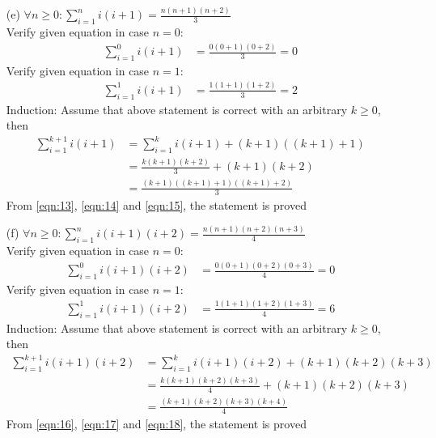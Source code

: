 \begin{enumerate}
    \newpage
    \item[(e)] $\forall n\geq 0: \displaystyle\sum^{n}_{i=1} i(i+1) = \frac{n(n+1)(n+2)}{3}$ \\
        Verify given equation in case $n=0$:
            \begin{align}
                \displaystyle\sum^{0}_{i=1} i(i+1) &= \frac{0(0+1)(0+2)}{3} = 0 \label{eqn:13}
            \end{align}
        Verify given equation in case $n=1$:
            \begin{align}
                \displaystyle\sum^{1}_{i=1} i(i+1) &= \frac{1(1+1)(1+2)}{3} = 2 \label{eqn:14}
            \end{align}
        Induction: Assume that above statement is correct with an arbitrary $k \geq 0$, then\\
        \begin{align}
            \displaystyle\sum^{k+1}_{i=1} i(i+1) &= \displaystyle\sum^{k}_{i=1} i(i+1) + (k+1)((k+1)+1) \\
                                            &= \frac{k(k+1)(k+2)}{3} + (k+1)(k+2) \\
                                            &= \frac{(k+1)((k+1)+1)((k+1)+2)}{3} \label{eqn:15}
        \end{align}
        From \ref{eqn:13}, \ref{eqn:14} and \ref{eqn:15}, the statement is proved
    
    \item[(f)] $\forall n\geq 0: \displaystyle\sum^{n}_{i=1} i(i+1)(i+2) = \frac{n(n+1)(n+2)(n+3)}{4}$ \\
        Verify given equation in case $n=0$:
            \begin{align}
                \displaystyle\sum^{0}_{i=1} i(i+1)(i+2) &= \frac{0(0+1)(0+2)(0+3)}{4} = 0 \label{eqn:16}
            \end{align}
        Verify given equation in case $n=1$:
            \begin{align}
                \displaystyle\sum^{1}_{i=1} i(i+1)(i+2) &= \frac{1(1+1)(1+2)(1+3)}{4} = 6 \label{eqn:17}
            \end{align}
        Induction: Assume that above statement is correct with an arbitrary $k \geq 0$, then\\
        \begin{align}
            \displaystyle\sum^{k+1}_{i=1} i(i+1)(i+2) &= \displaystyle\sum^{k}_{i=1} i(i+1)(i+2) + (k+1)(k+2)(k+3) \\
                                            &= \frac{k(k+1)(k+2)(k+3)}{4} + (k+1)(k+2)(k+3) \\
                                            &= \frac{(k+1)(k+2)(k+3)(k+4)}{4} \label{eqn:18}
        \end{align}
        From \ref{eqn:16}, \ref{eqn:17} and \ref{eqn:18}, the statement is proved
    

\end{enumerate}
